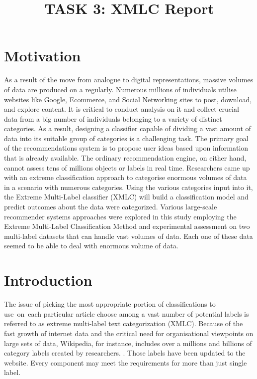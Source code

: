 \documentclass[a4paper]{article}
\title{TASK 3: XMLC Report }
\begin{document}
\maketitle
\section{Motivation}
As a result of the move from analogue to digital representations, massive volumes of data are produced on a regularly. Numerous millions of individuals utilise websites like Google, Ecommerce, and Social Networking sites to post, download, and explore content. It is critical to conduct analysis on it and collect crucial data from a big number of individuals belonging to a variety of distinct categories. As a result, designing a classifier capable of dividing a vast amount of data into its suitable group of categories is a challenging task. The primary goal of the recommendations system is to propose user ideas based upon information that is already available\cite{read2015multi}. The ordinary recommendation engine, on either hand, cannot assess tens of millions objects or labels in real time. Researchers came up with an extreme classification approach to categorise enormous volumes of data in a scenario with numerous categories\cite{li2016weighted}. Using the various categories input into it, the Extreme Multi-Label classifier (XMLC) will build a classification model and predict outcomes about the data were categorized. Various large-scale recommender systems approaches were explored in this study employing the Extreme Multi-Label Classification Method and experimental assessment on two multi-label datasets that can handle vast volumes of data. Each one of these data seemed to be able to deal with enormous volume of data.

\section{Introduction}
The issue of picking the most appropriate portion of classifications to use on each particular article choose among a vast number of potential labels is referred to as extreme multi-label text categorization (XMLC). Because of the fast growth of internet data and the critical need for organisational viewpoints on large sets of data, Wikipedia, for instance, includes over a millions and billions of category labels created by researchers. \cite{bib1}. Those labels have been updated to the website. Every component may meet the requirements for more than just single label.
\end{document}

